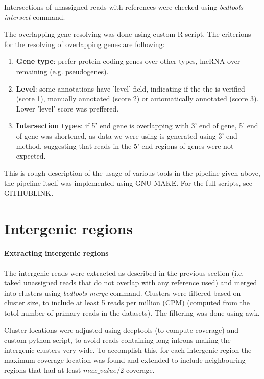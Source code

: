 Intersections of unassigned reads with references were checked using \textit{bedtools intersect} command.

The overlapping gene resolving was done using custom R script.
The criterions for the resolving of overlapping genes are following:
\begin{enumerate}
  \item \textbf{Gene type}: prefer protein coding genes over other types, lncRNA over remaining (e.g. pseudogenes).
  \item \textbf{Level}: some annotations have 'level' field, indicating if the the is verified (score 1), manually annotated (score 2)
  or automatically annotated (score 3). Lower 'level' score was preffered.
  \item \textbf{Intersection types}: if 5' end gene is overlapping with 3' end of gene, 5' end of gene was shortened,
  as data we were using is generated using 3' end method, suggesting that reads in the 5' end regions of genes were not expected.
\end{enumerate}

This is rough description of the usage of various tools in the pipeline given above, the pipeline itself was implemented using GNU MAKE.
For the full scripts, see GITHUBLINK.

\section{Intergenic regions}

\paragraph{Extracting intergenic regions}

The intergenic reads were extracted as described in the previous section (i.e. taked unassigned reads that do not overlap with any reference used)
and merged into clusters using \textit{bedtools merge} command.
Clusters were filtered based on cluster size, to include at least 5 reads per million (CPM)
(computed from the totol number of primary reads in the datasets).
The filtering was done using awk.

Cluster locations were adjusted using deeptools (to compute coverage) and custom python script,
to avoid reads containing long introns making the intergenic clusters very wide.
To accomplish this, for each intergenic region the maximum coverage location was found and extended to include neighbouring regions that had
at least $max\_value / 2$ coverage.

